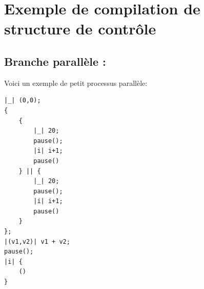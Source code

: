 \documentclass[a4paper]{article}
\renewcommand{\(}{\left(}
\renewcommand{\)}{\right)}
\begin{document}
\section{Exemple de compilation de structure de contrôle}

\subsection{Branche parallèle :}

Voici un exemple de petit processus parallèle:
\begin{verbatim}
|_| (0,0);
{
    {
        |_| 20;
        pause();
        |i| i+1;
        pause()
    } || {
        |_| 20;
        pause();
        |i| i+1;
        pause()
    }
};
|(v1,v2)| v1 + v2;
pause();
|i| {
    ()
}
\end{verbatim}
\end{document}
